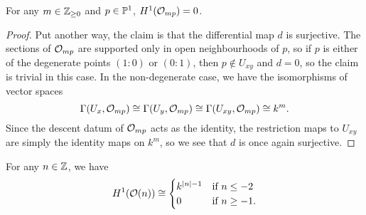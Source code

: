 \begin{lemma}
  For any $m \in \mathbb{Z}_{\geq 0}$ and $p \in \mathbb{P}^{{1}}$, $H^1(\mathcal{O}_{{mp}}) = 0$.
\end{lemma}

\begin{proof}
  Put another way, the claim is that the differential map $d$ is surjective.
  The sections of $\mathcal{O}_{{mp}}$ are supported only in open
  neighbourhoods of $p$, so if $p$ is either of the degenerate points
  $(1 : 0)$ or $(0 : 1)$, then $p \not\in U_{xy}$ and $d = 0$, so the
  claim is trivial in this case.
  In the non-degenerate case, we have the isomorphisms of vector spaces
  \[
    \Gamma({U_x}, {\mathcal{O}_{{mp}}})
    \cong \Gamma({U_y}, {\mathcal{O}_{{mp}}})
    \cong \Gamma({U_{xy}}, {\mathcal{O}_{{mp}}})
    \cong k^m.
  \]
  Since the descent datum of $\mathcal{O}_{{mp}}$ acts as the identity,
  the restriction maps to $U_{xy}$ are simply the identity maps on
  $k^m$, so we see that $d$ is once again surjective.
\end{proof}

\begin{lemma}
  \label{lemma_h1_twist}
  For any $n \in \mathbb{Z}$, we have
  \[
    H^1(\mathcal{O}({n}))
    \cong
    \begin{cases}
      k^{|n| - 1} & \text{if } n \leq -2 \\
      0 & \text{if } n \geq -1.
    \end{cases}
  \]
\end{lemma}

